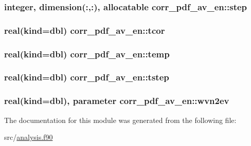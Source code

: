 \hypertarget{classcorr__pdf__av__en_af7228710cff0435d673df814f2730bc6}{
\subsubsection[{step}]{\setlength{\rightskip}{0pt plus 5cm}integer, dimension(\+:,\+:), allocatable corr\+\_\+pdf\+\_\+av\+\_\+en\+::step}}\label{classcorr__pdf__av__en_af7228710cff0435d673df814f2730bc6}
\hypertarget{classcorr__pdf__av__en_a88a55ad1c3cae9c9628071b76b317988}{
\subsubsection[{tcor}]{\setlength{\rightskip}{0pt plus 5cm}real(kind={\bf dbl}) corr\+\_\+pdf\+\_\+av\+\_\+en\+::tcor}}\label{classcorr__pdf__av__en_a88a55ad1c3cae9c9628071b76b317988}
\hypertarget{classcorr__pdf__av__en_a3cd4b5a742e1c9ef5ac18030ebcc306f}{
\subsubsection[{temp}]{\setlength{\rightskip}{0pt plus 5cm}real(kind={\bf dbl}) corr\+\_\+pdf\+\_\+av\+\_\+en\+::temp}}\label{classcorr__pdf__av__en_a3cd4b5a742e1c9ef5ac18030ebcc306f}
\hypertarget{classcorr__pdf__av__en_a91764d368760db242051446a5f8974ab}{
\subsubsection[{tstep}]{\setlength{\rightskip}{0pt plus 5cm}real(kind={\bf dbl}) corr\+\_\+pdf\+\_\+av\+\_\+en\+::tstep}}\label{classcorr__pdf__av__en_a91764d368760db242051446a5f8974ab}
\hypertarget{classcorr__pdf__av__en_ad852fb314fcb49c5ff8336f6a883871b}{
\subsubsection[{wvn2ev}]{\setlength{\rightskip}{0pt plus 5cm}real(kind={\bf dbl}), parameter corr\+\_\+pdf\+\_\+av\+\_\+en\+::wvn2ev}}\label{classcorr__pdf__av__en_ad852fb314fcb49c5ff8336f6a883871b}


The documentation for this module was generated from the following file\+:\begin{DoxyCompactItemize}
\item 
src/\hyperlink{analysis_8f90}{analysis.\+f90}\end{DoxyCompactItemize}
